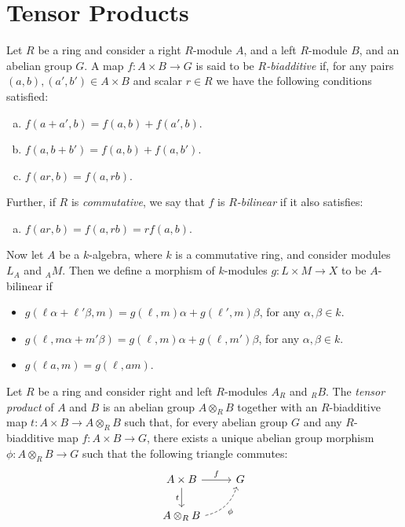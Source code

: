 \section{Tensor Products}

\begin{definition}
    \label{def:biadditive-and-bilinear-maps}
    Let \(R\) be a ring and consider a right \(R\)-module \(A\), and a left
    \(R\)-module \(B\), and an abelian group \(G\). A map \(f: A \times B \to G\) is
    said to be \emph{\(R\)-biadditive} if, for any pairs \((a, b), (a', b') \in A \times
    B\) and scalar \(r \in R\) we have the following conditions satisfied:
    \begin{enumerate}[(a)]\setlength\itemsep{0em}
        \item \(f(a + a', b) = f(a, b) + f(a', b)\).
        \item \(f(a, b + b') = f(a, b) + f(a, b')\).
        \item \(f(a r, b) = f(a, r b)\).
    \end{enumerate}
    Further, if \(R\) is \emph{commutative}, we say that \(f\) is
    \emph{\(R\)-bilinear} if it also satisfies:
    \begin{enumerate}[(a)]\setlength\itemsep{0em}\setcounter{enumi}{3}
        \item \(f(a r, b) = f(a, rb) = r f(a, b)\).
    \end{enumerate}

    Now let \(A\) be a \(k\)-algebra, where \(k\) is a commutative ring, and
    consider modules \(L_A\) and \({}_AM\). Then we define a morphism of
    \(k\)-modules \(g: L \times M \to X\) to be \(A\)-bilinear if
    \begin{itemize}\setlength\itemsep{0em}
        \item \(g(\ell \alpha + \ell' \beta, m) = g(\ell, m) \alpha + g(\ell', m) \beta\), for any \(\alpha, \beta \in k\).
        \item \(g(\ell, m \alpha + m' \beta) = g(\ell, m) \alpha + g(\ell, m') \beta\), for any \(\alpha, \beta \in k\).
        \item \(g(\ell a, m) = g(\ell, a m)\).
    \end{itemize}
\end{definition}

\begin{definition}
    \label{def:tensor-product}
    Let \(R\) be a ring and consider right and left \(R\)-modules \(A_R\) and
    \({}_RB\). The \emph{tensor product} of \(A\) and \(B\) is an abelian group
    \(A \otimes_R B\) together with an \(R\)-biadditive map
    \(t: A \times B \to A \otimes_R B\) such that, for every abelian group \(G\) and
    any \(R\)-biadditive map \(f: A \times B \to G\), there exists a unique abelian
    group morphism \(\phi: A \otimes_R B \to G\) such that the following triangle
    commutes:
    \[
        \begin{tikzcd}
            A \times B \ar[d, "t"'] \ar[r, "f"] &G \\
            A \otimes_R B \ar[ru, dashed, "\phi"', bend right] &
        \end{tikzcd}
    \]
\end{definition}

